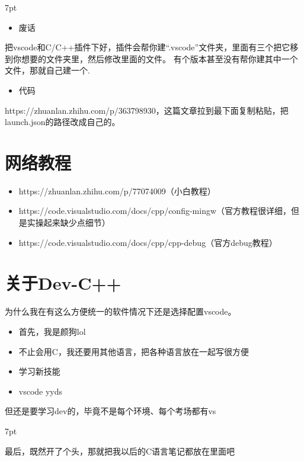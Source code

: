 \documentclass{book}
\newenvironment{formal1}{%
\def\FrameCommand{%
\hspace{1pt}%
{\color{DarkBlue}\vrule width 2pt}%
{\color{SteelBlue}\vrule width 4pt}%
\colorbox{formalshade}%
}%
\MakeFramed{\advance\hsize-\width\FrameRestore}%
\noindent\hspace{-4.55pt}%
\begin{adjustwidth}{}{7pt}%
\vspace{2pt}\vspace{2pt}%
}
{%
\vspace{2pt}\end{adjustwidth}\endMakeFramed%
}
\newenvironment{formal2}{%
\def\FrameCommand{%
\hspace{1pt}%
{\color{Green}\vrule width 2pt}%
{\color{DarkSeaGreen1}\vrule width 4pt}%
\colorbox{greenshade}%
}%
\MakeFramed{\advance\hsize-\width\FrameRestore}%
\noindent\hspace{-4.55pt}%
\begin{adjustwidth}{}{7pt}%
\vspace{2pt}\vspace{2pt}%
}
{%
\vspace{2pt}\end{adjustwidth}\endMakeFramed%
}
\begin{document}
\begin{formal1}
\begin{itemize}
\item 废话
\end{itemize}
把vscode和C/C++插件下好，插件会帮你建“.vscode”文件夹，里面有三个把它移到你想要的文件夹里，然后修改里面的文件。
有个版本甚至没有帮你建其中一个文件，那就自己建一个.\\
\begin{itemize}
\item 代码
\end{itemize}
https://zhuanlan.zhihu.com/p/363798930，这篇文章拉到最下面复制粘贴，把launch.json的路径改成自己的。
\end{formal1}

\section{网络教程}
\begin{itemize}
    \item https://zhuanlan.zhihu.com/p/77074009（小白教程）
    \item https://code.visualstudio.com/docs/cpp/config-mingw（官方教程很详细，但是实操起来缺少点细节）
    \item https://code.visualstudio.com/docs/cpp/cpp-debug（官方debug教程）
\end{itemize}

\section{关于Dev-C++}
为什么我在有这么方便统一的软件情况下还是选择配置vscode。
\begin{itemize}
    \item 首先，我是颜狗lol
    \item 不止会用C，我还要用其他语言，把各种语言放在一起写很方便
    \item 学习新技能
    \item vscode yyds
\end{itemize}
但还是要学习dev的，毕竟不是每个环境、每个考场都有vs
\begin{formal2}
最后，既然开了个头，那就把我以后的C语言笔记都放在里面吧
\end{formal2}
\end{document}

